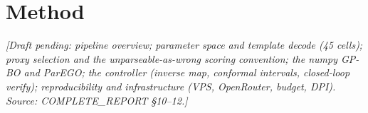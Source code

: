 \chapter{Method}
\label{ch:method}
\emph{[Draft pending: pipeline overview; parameter space and template decode (45 cells);
proxy selection and the unparseable-as-wrong scoring convention; the numpy GP-BO and ParEGO;
the controller (inverse map, conformal intervals, closed-loop verify); reproducibility and
infrastructure (VPS, OpenRouter, budget, DPI). Source: COMPLETE\_REPORT \S10--12.]}

